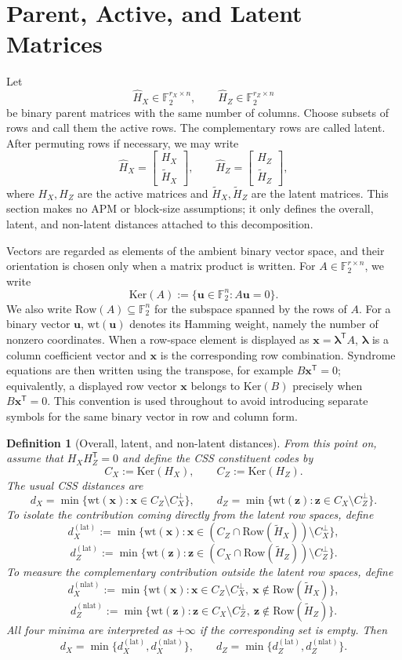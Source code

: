 \documentclass[11pt]{article}
\newcommand{\Ftwo}{\mathbb{F}_2}
\newcommand{\Ker}{\mathrm{Ker}}
\newcommand{\Row}{\mathrm{Row}}
\newcommand{\wt}{\mathrm{wt}}
\newcommand{\Hhat}{\hat{H}}
\newcommand{\Htil}{\tilde{H}}
\newcommand{\vect}[1]{\bm{#1}}
\newcommand{\vx}{\vect{x}}
\newcommand{\vz}{\vect{z}}
\newcommand{\vu}{\vect{u}}
\newcommand{\vlambda}{\vect{\lambda}}
\theoremstyle{uprightthm}
\newtheorem{definition}[theorem]{Definition}
\begin{document}
\section{Parent, Active, and Latent Matrices}
\label{sec:framework-en}
Let
\[
\Hhat_X\in\Ftwo^{r_X\times n},\qquad
\Hhat_Z\in\Ftwo^{r_Z\times n}
\]
be binary parent matrices with the same number of columns.
Choose subsets of rows and call them the active rows.
The complementary rows are called latent.
After permuting rows if necessary, we may write
\[
\Hhat_X=\begin{bmatrix}H_X\\ \Htil_X\end{bmatrix},\qquad
\Hhat_Z=\begin{bmatrix}H_Z\\ \Htil_Z\end{bmatrix},
\]
where $H_X,H_Z$ are the active matrices and $\Htil_X,\Htil_Z$ are the latent matrices.
This section makes no APM or block-size assumptions; it only defines the
overall, latent, and non-latent distances attached to this decomposition.

Vectors are regarded as elements of the ambient binary vector space, and their
orientation is chosen only when a matrix product is written.  For
$A\in\Ftwo^{r\times n}$, we write
\[
\Ker(A):=\{\vu\in\Ftwo^n:A\vu=0\}.
\]
We also write $\Row(A)\subseteq\Ftwo^n$ for the subspace spanned by the rows of
$A$.  For a binary vector $\vu$, $\wt(\vu)$ denotes its Hamming weight, namely
the number of nonzero coordinates.  When a row-space element is displayed as
$\vx=\vlambda^{\mathsf T}A$,
$\vlambda$ is a column coefficient vector and $\vx$ is the corresponding row
combination.  Syndrome equations are then written using the transpose, for
example $B\vx^{\mathsf T}=0$; equivalently, a displayed row vector $\vx$
belongs to $\Ker(B)$ precisely when $B\vx^{\mathsf T}=0$.  This convention is
used throughout to avoid introducing separate symbols for the same binary vector
in row and column form.

\begin{definition}[Overall, latent, and non-latent distances]
\label{def:latent-nonlatent-distances-en}
From this point on, assume that $H_XH_Z^{\mathsf T}=0$ and define the CSS constituent codes by
\[
C_X:=\Ker(H_X),\qquad C_Z:=\Ker(H_Z).
\]
The usual CSS distances are
\[
d_X=\min\{\wt(\vx):\vx\in C_Z\setminus C_X^\perp\},\qquad
d_Z=\min\{\wt(\vz):\vz\in C_X\setminus C_Z^\perp\}.
\]
To isolate the contribution coming directly from the latent row spaces, define
\[
d_X^{(\mathrm{lat})}:=
\min\{\wt(\vx):\vx\in (C_Z\cap \Row(\Htil_X))\setminus C_X^\perp\},
\]
\[
d_Z^{(\mathrm{lat})}:=
\min\{\wt(\vz):\vz\in (C_X\cap \Row(\Htil_Z))\setminus C_Z^\perp\}.
\]
To measure the complementary contribution outside the latent row spaces, define
\[
d_X^{(\mathrm{nlat})}:=
\min\{\wt(\vx):\vx\in C_Z\setminus C_X^\perp,\ \vx\notin \Row(\Htil_X)\},
\]
\[
d_Z^{(\mathrm{nlat})}:=
\min\{\wt(\vz):\vz\in C_X\setminus C_Z^\perp,\ \vz\notin \Row(\Htil_Z)\}.
\]
All four minima are interpreted as $+\infty$ if the corresponding set is empty.
Then
\[
d_X=\min\{d_X^{(\mathrm{lat})},d_X^{(\mathrm{nlat})}\},
\qquad
d_Z=\min\{d_Z^{(\mathrm{lat})},d_Z^{(\mathrm{nlat})}\}.
\]
\end{definition}
\end{document}
